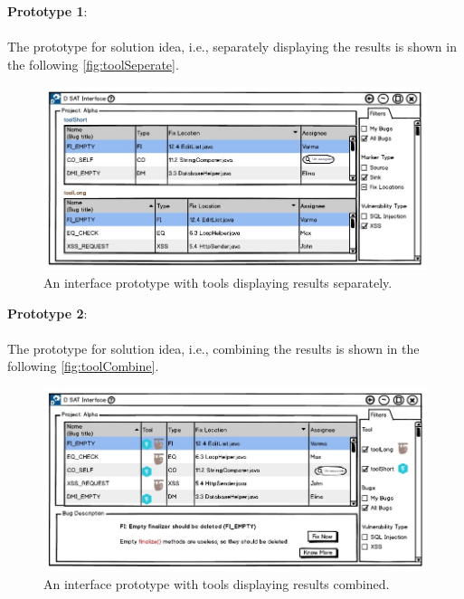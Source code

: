 \clearpage

\textbf{Prototype 1}:
\\ \\
The prototype for solution idea, i.e., separately displaying the results is shown in the following \autoref{fig:toolSeperate}. \\ 

\begin{figure}[hbt!]
	\centering
	\includegraphics[width=\linewidth]{figures/d_seperate}
	\caption{An interface prototype with tools displaying results separately.}
	\label{fig:toolSeperate}
\end{figure}

\textbf{Prototype 2}:
\\ \\
The prototype for solution idea, i.e., combining the results is shown in the following \autoref{fig:toolCombine}. \\

\begin{figure}[hbt!]
	\centering
	\includegraphics[width=\linewidth]{figures/d_combine}
	\caption{An interface prototype with tools displaying results combined.}
	\label{fig:toolCombine}
\end{figure}

\clearpage

